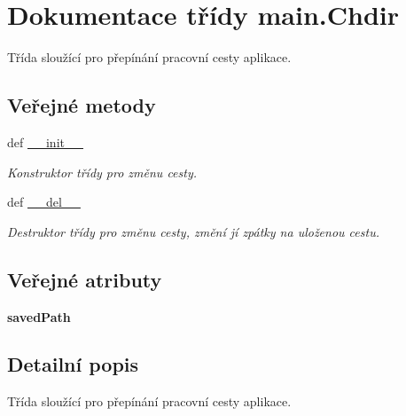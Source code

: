 \hypertarget{classmain_1_1Chdir}{\section{Dokumentace třídy main.\-Chdir}
\label{d2/dbd/classmain_1_1Chdir}
}


Třída sloužící pro přepínání pracovní cesty aplikace.  


\subsection*{Veřejné metody}
\begin{DoxyCompactItemize}
\item 
def \hyperlink{classmain_1_1Chdir_ac7361f2ea260c83ed6b42a7047c80214}{\-\_\-\-\_\-init\-\_\-\-\_\-}
\begin{DoxyCompactList}\small\item\em Konstruktor třídy pro změnu cesty. \end{DoxyCompactList}\item 
def \hyperlink{classmain_1_1Chdir_add811e304912724c03da489a37cfe2d5}{\-\_\-\-\_\-del\-\_\-\-\_\-}
\begin{DoxyCompactList}\small\item\em Destruktor třídy pro změnu cesty, změní jí zpátky na uloženou cestu. \end{DoxyCompactList}\end{DoxyCompactItemize}
\subsection*{Veřejné atributy}
\begin{DoxyCompactItemize}
\item 
\hypertarget{classmain_1_1Chdir_a8fcc4e44e462eb780f7694ba60f226d9}{{\bfseries saved\-Path}}\label{d2/dbd/classmain_1_1Chdir_a8fcc4e44e462eb780f7694ba60f226d9}

\end{DoxyCompactItemize}


\subsection{Detailní popis}
Třída sloužící pro přepínání pracovní cesty aplikace. 

